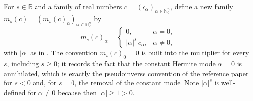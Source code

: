 \begin{definition}
For $s \in \mathbb{R}$ and a family of real numbers
$c = (c_\alpha)_{\alpha \in \mathbb{N}_0^n}$, define a new family
$m_s(c) = (m_s(c)_\alpha)_{\alpha \in \mathbb{N}_0^n}$ by
\[
  m_s(c)_\alpha =
  \begin{cases}
    0, & \alpha = 0,\\[2pt]
    |\alpha|^{s}\, c_\alpha, & \alpha \neq 0,
  \end{cases}
\]
with $|\alpha|$ as in .  The convention
$m_s(c)_0 = 0$ is built into the multiplier for every $s$, including $s \geq 0$;
it records the fact that the constant Hermite mode $\alpha = 0$ is annihilated,
which is exactly the pseudoinverse convention of the reference paper for $s<0$
and, for $s=0$, the removal of the constant mode.  Note $|\alpha|^s$ is
well-defined for $\alpha \neq 0$ because then $|\alpha| \geq 1 > 0$.
\end{definition}
